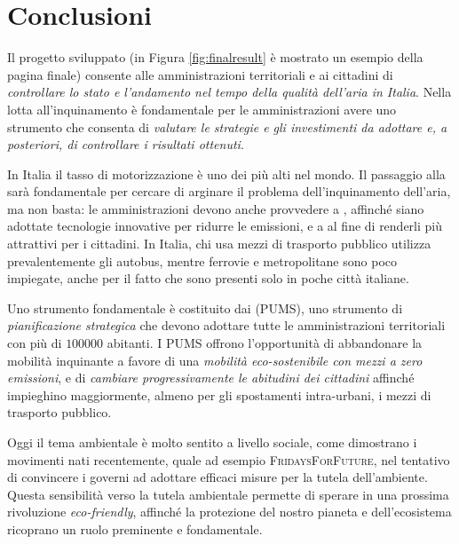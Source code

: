 \chapter{Conclusioni}

Il progetto sviluppato (in Figura \vref{fig:finalresult} è mostrato un esempio
della pagina finale) consente alle amministrazioni territoriali e ai cittadini
di \emph{controllare lo stato e l'andamento nel tempo della qualità dell'aria in
Italia}. Nella lotta all'inquinamento è fondamentale per le amministrazioni
avere uno strumento che consenta di \emph{valutare le strategie e gli
investimenti da adottare e, a posteriori, di controllare i risultati ottenuti}.

In Italia il tasso di motorizzazione è uno dei più alti nel mondo. Il passaggio
alla  sarà fondamentale per cercare di arginare il
problema dell'inquinamento dell'aria, ma non basta: le amministrazioni devono
anche provvedere a , affinché siano
adottate tecnologie innovative per ridurre le emissioni, e a
 al fine di renderli più
attrattivi per i cittadini. In Italia, chi usa mezzi di trasporto pubblico
utilizza prevalentemente gli autobus, mentre ferrovie e metropolitane sono poco
impiegate, anche per il fatto che sono presenti solo in poche città italiane.

Uno strumento fondamentale è costituito dai  (PUMS), uno strumento di \emph{pianificazione strategica}
che devono adottare tutte le amministrazioni territoriali con più di \(100000\)
abitanti.  I PUMS offrono l'opportunità di abbandonare la mobilità inquinante a
favore di una \emph{mobilità eco-sostenibile con mezzi a zero emissioni}, e di
\emph{cambiare progressivamente le abitudini dei cittadini} affinché impieghino
maggiormente, almeno per gli spostamenti intra-urbani, i mezzi di trasporto
pubblico.

Oggi il tema ambientale è molto sentito a livello sociale, come dimostrano i
movimenti nati recentemente, quale ad esempio \textsc{FridaysForFuture}, nel
tentativo di convincere i governi ad adottare efficaci misure per la tutela
dell'ambiente. Questa sensibilità verso la tutela ambientale permette di sperare
in una prossima rivoluzione \textit{eco-friendly}, affinché la protezione del
nostro pianeta e dell'ecosistema ricoprano un ruolo preminente e fondamentale.

